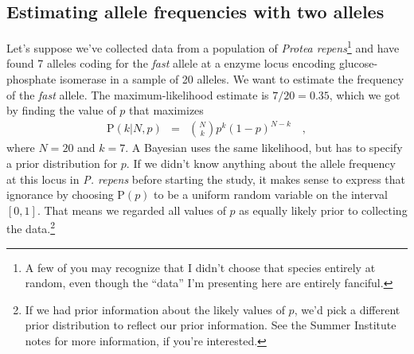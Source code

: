 \documentclass[12pt]{article}
\begin{document}
\subsection*{Estimating allele frequencies with two alleles}

Let's suppose we've collected data from a population of {\it Protea
  repens}\footnote{A few of you may recognize that I didn't choose
  that species entirely at random, even though the ``data'' I'm
  presenting here are entirely fanciful.} and have found 7 alleles
coding for the {\it fast\/} allele at a enzyme locus encoding
glucose-phosphate isomerase in a sample of 20 alleles. We want to
estimate the frequency of the {\it fast\/} allele. The
maximum-likelihood estimate is $7/20 = 0.35$, which we got by finding
the value of $p$ that maximizes
\begin{eqnarray*}
\mbox{P}(k|N,p) &=& {N \choose k} p^k (1-p)^{N-k} \quad ,
\end{eqnarray*}
where $N=20$ and $k=7$. A Bayesian uses the same likelihood, but has
to specify a prior distribution for $p$. If we didn't know anything
about the allele frequency at this locus in {\it P. repens} before
starting the study, it makes sense to express that ignorance by
choosing $\mbox{P}(p)$ to be a uniform random variable on the interval
$[0,1]$. That means we regarded all values of $p$ as equally likely
prior to collecting the data.\footnote{If we had prior information
  about the likely values of $p$, we'd pick a different prior
  distribution to reflect our prior information. See the Summer
  Institute notes for more information, if you're interested.}
\end{document}
